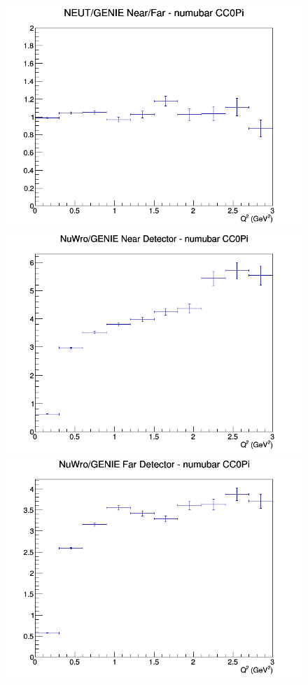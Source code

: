 \begin{figure}[h]
\endminipage
{}
\includegraphics[width=\linewidth]{eff_Q2/FGT/ratios/CC0Pi_NEUT_GENIE_numubar_NF_Q2.png}
\endminipage
\newline
{}
\includegraphics[width=\linewidth]{eff_Q2/FGT/ratios/CC0Pi_NuWro_GENIE_numubar_near_Q2.png}
\endminipage
{}
\includegraphics[width=\linewidth]{eff_Q2/FGT/ratios/CC0Pi_NuWro_GENIE_numubar_far_Q2.png}

\end{figure}
